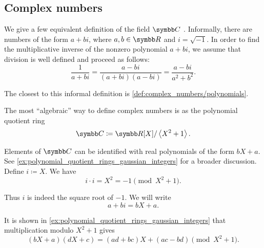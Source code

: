 \subsection{Complex numbers}\label{subsec:complex_numbers}

\begin{definition}\label{def:complex_numbers}
  We give a few equivalent definition of the field \( \BC \) . Informally, there are numbers of the form \( a + bi \), where \( a, b \in \BR \) and \( i = \sqrt{-1} \). In order to find the multiplicative inverse of the nonzero polynomial \( a + bi \), we assume that division is well defined and proceed as follows:
  \begin{equation}\label{def:complex_numbers/inverse}
    \frac 1 {a + bi} = \frac {a - bi} {(a + bi)(a - bi)} = \frac{a - bi}{a^2 + b^2}.
  \end{equation}

  The closest to this informal definition is \cref{def:complex_numbers/polynomials}.

  \begin{defenum}
     The most \enquote{algebraic} way to define complex numbers is as the polynomial quotient ring
    \begin{equation*}
      \BC \coloneqq \BR[X] / \Gen{X^2 + 1}.
    \end{equation*}

    Elements of \( \BC \) can be identified with real polynomials of the form \( bX + a \). See \cref{ex:polynomial_quotient_rings_gaussian_integers} for a broader discussion.
    Define \( i \coloneqq X \). We have
    \begin{equation*}
      i \cdot i = X^2 = -1 \pmod {X^2 + 1}.
    \end{equation*}

    Thus \( i \) is indeed the square root of \( -1 \). We will write
    \begin{equation*}
      a + bi = bX + a.
    \end{equation*}

    It is shown in \cref{ex:polynomial_quotient_rings_gaussian_integers} that multiplication modulo \( X^2 + 1 \) gives
    \begin{equation}\label{def:complex_numbers/polynomials/multiplication}
     (bX + a) (dX + c) = (ad + bc)X + (ac - bd) \pmod {X^2 + 1}.
    \end{equation}


\end{defenum}
\end{definition}
